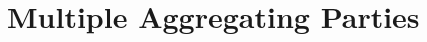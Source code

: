 \chapter{Multiple Aggregating Parties}
\label{app:manyAggregatingParties}


\begin{comment}
Let $x=\sum_{j=0}^{l-1} x_j u^j$, where $x_j$ is an integer and $x_j\in[0,u)$, $u,l$ are integers and $j\in[0,l-1] (=\mathds{Z}_l)$. Then it holds that $x\in[0,u^l)$.
\begin{align*}
x =& \sum_{j=0}^{l-1} x_j u^j \leq \sum_{j=0}^{l-1}  (u-1)u^j = \sum_{j=0}^{l-1} u^{j+1} - \sum_{j=0}^{l-1} u^j = (u-1) \sum_{j=0}^{l-1} u^j =\\
 &(u-1) \frac{u^l-1}{u-1} = u^l-1< u^l 
\end{align*}
Hence the  statement is proved and it is trivial to see that if $j\in[0,l]$ the value of $x$ could exceed $u^l$.
\end{comment}
